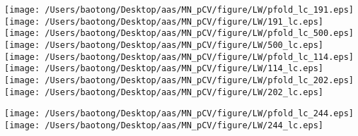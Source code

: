 \documentclass{aastex63}
\begin{document}
\clearpage
\begin{figure*}[!ht]
\centering
\texttt{[image: /Users/baotong/Desktop/aas/MN\_pCV/figure/LW/pfold\_lc\_191.eps]}
\hfill
\texttt{[image: /Users/baotong/Desktop/aas/MN\_pCV/figure/LW/191\_lc.eps]}
\hfill
{}
\texttt{[image: /Users/baotong/Desktop/aas/MN\_pCV/figure/LW/pfold\_lc\_500.eps]}
\hfill
\texttt{[image: /Users/baotong/Desktop/aas/MN\_pCV/figure/LW/500\_lc.eps]}
\hfill
{}
\texttt{[image: /Users/baotong/Desktop/aas/MN\_pCV/figure/LW/pfold\_lc\_114.eps]}
\hfill
\texttt{[image: /Users/baotong/Desktop/aas/MN\_pCV/figure/LW/114\_lc.eps]}
\hfill
{}
\texttt{[image: /Users/baotong/Desktop/aas/MN\_pCV/figure/LW/pfold\_lc\_202.eps]}
\hfill
\texttt{[image: /Users/baotong/Desktop/aas/MN\_pCV/figure/LW/202\_lc.eps]}
\hfill
{}
\end{figure*}
\clearpage
\begin{figure*}[!ht]
\centering
\texttt{[image: /Users/baotong/Desktop/aas/MN\_pCV/figure/LW/pfold\_lc\_244.eps]}
\hfill
\texttt{[image: /Users/baotong/Desktop/aas/MN\_pCV/figure/LW/244\_lc.eps]}
\hfill
{}\end{figure*}
\clearpage
\end{document}
